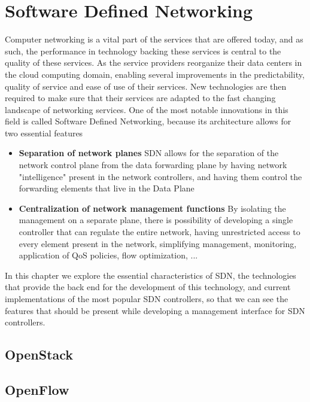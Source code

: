 \chapter{Software Defined Networking} \label{chap:sdn} %

Computer networking is a vital part of the services that are offered today, and as such, the performance in technology backing these services is central to the quality of these services. As the service providers reorganize their
data centers in the cloud computing domain, enabling several improvements in the predictability, quality of service and ease of use of their services. New technologies are then required to make sure that their services are adapted
to the fast changing landscape of networking services. One of the most notable innovations in this field is called Software Defined Networking, because its architecture allows for two essential features

\begin {itemize}
    \item \textbf{Separation of network planes} SDN allows for the separation of the network control plane from the data forwarding plane by having network "intelligence" present in the network controllers, and having them
control the forwarding elements that live in the Data Plane
    \item \textbf{Centralization of network management functions} By isolating the management on a separate plane, there is possibility of developing a single controller that can regulate the entire network, having unrestricted access to every element present in the network, simplifying management, monitoring, application of QoS policies, flow optimization, ...
\end {itemize}

In this chapter we explore the essential characteristics of SDN, the technologies that provide the back end for the development of this technology, and current implementations of the most popular SDN controllers, so that we can 
see the features that should be present while developing a management interface for SDN controllers.

\section {OpenStack}
\section {OpenFlow}

